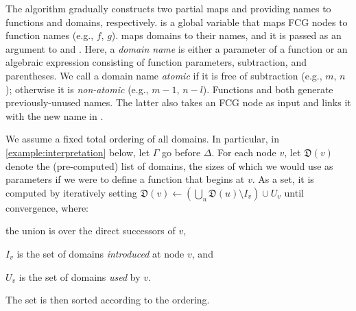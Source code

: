 \documentclass{article}
\begin{document}
The algorithm gradually constructs two partial maps \functionNames and
\domainNames providing names to functions and domains, respectively.
\functionNames is a global variable that maps FCG nodes to function names (e.g.,
$f$, $g$). \domainNames maps domains to their names, and it is passed as an
argument to \visit and \actuallyVisit. Here, a \emph{domain name} is either a
parameter of a function or an algebraic expression consisting of function
parameters, subtraction, and parentheses. We call a domain name \emph{atomic} if
it is free of subtraction (e.g., $m$, $n$); otherwise it is \emph{non-atomic}
(e.g., $m-1$, $n-l$). Functions \newDomainName and \newFunctionName both
generate previously-unused names. The latter also takes an FCG node as input and
links it with the new name in \functionNames.

We assume a fixed total ordering of all domains. In particular, in
\cref{example:interpretation} below, let $\Gamma$ go before $\Delta$. For each
node $v$, let $\mathfrak{D}(v)$ denote the (pre-computed) list of domains, the
sizes of which we would use as parameters if we were to define a function that
begins at $v$. As a set, it is computed by iteratively setting
$\mathfrak{D}(v) \gets \left(\bigcup_{u} \mathfrak{D}(u) \setminus I_{v}\right) \cup U_{v}$
until convergence, where:
\begin{enumerate*}[label=(\roman*)]
  \item the union is over the direct successors of $v$,
  \item $I_{v}$ is the set of domains \emph{introduced} at node $v$, and
  \item $U_{v}$ is the set of domains \emph{used} by $v$.
\end{enumerate*}
The set is then sorted according to the ordering.
\end{document}
